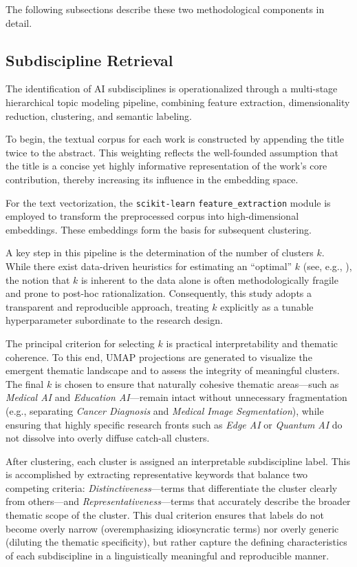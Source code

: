 \documentclass{article}
\begin{document}
The following subsections describe these two methodological components in detail.


\subsection{Subdiscipline Retrieval}


The identification of AI subdisciplines is operationalized through a multi-stage hierarchical topic modeling pipeline, combining feature extraction, dimensionality reduction, clustering, and semantic labeling.

To begin, the textual corpus for each work is constructed by appending the title twice to the abstract. This weighting reflects the well-founded assumption that the title is a concise yet highly informative representation of the work’s core contribution, thereby increasing its influence in the embedding space.

For the text vectorization, the \texttt{scikit-learn} \texttt{feature\_extraction} module is employed to transform the preprocessed corpus into high-dimensional embeddings. These embeddings form the basis for subsequent clustering.

A key step in this pipeline is the determination of the number of clusters \(k\). While there exist data-driven heuristics for estimating an ``optimal'' \(k\) (see, e.g., \cite{bulatov2024determination}), the notion that \(k\) is inherent to the data alone is often methodologically fragile and prone to post-hoc rationalization. Consequently, this study adopts a transparent and reproducible approach, treating \(k\) explicitly as a tunable hyperparameter subordinate to the research design.

The principal criterion for selecting \(k\) is practical interpretability and thematic coherence. To this end, UMAP projections are generated to visualize the emergent thematic landscape and to assess the integrity of meaningful clusters. The final \(k\) is chosen to ensure that naturally cohesive thematic areas—such as \textit{Medical AI} and \textit{Education AI}—remain intact without unnecessary fragmentation (e.g., separating \textit{Cancer Diagnosis} and \textit{Medical Image Segmentation}), while ensuring that highly specific research fronts such as \textit{Edge AI} or \textit{Quantum AI} do not dissolve into overly diffuse catch-all clusters.

After clustering, each cluster is assigned an interpretable subdiscipline label. This is accomplished by extracting representative keywords that balance two competing criteria: \textit{Distinctiveness}—terms that differentiate the cluster clearly from others—and \textit{Representativeness}—terms that accurately describe the broader thematic scope of the cluster. This dual criterion ensures that labels do not become overly narrow (overemphasizing idiosyncratic terms) nor overly generic (diluting the thematic specificity), but rather capture the defining characteristics of each subdiscipline in a linguistically meaningful and reproducible manner.
\end{document}
